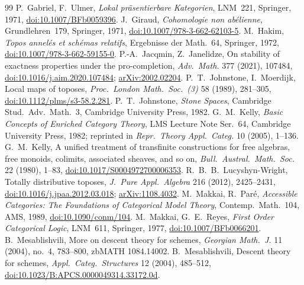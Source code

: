 \documentclass[11pt,a4paper]{amsart}
\theoremstyle{definition}
\theoremstyle{remark}
\begin{document}
\begin{thebibliography}{99}
 P.~Gabriel, F.~Ulmer, \emph{Lokal präsentierbare Kategorien}, LNM~221, Springer, 1971, \href{https://doi.org/10.1007/BFb0059396}{doi:10.1007/BFb0059396}.
 J.~Giraud, \emph{Cohomologie non abélienne}, Grundlehren~179, Springer, 1971, \href{https://doi.org/10.1007/978-3-662-62103-5}{doi:10.1007/978-3-662-62103-5}.
 M.~Hakim, \emph{Topos annelés et schémas relatifs}, Ergebnisse der Math.~64, Springer, 1972, \href{https://doi.org/10.1007/978-3-662-59155-0}{doi:10.1007/978-3-662-59155-0}.
 P.-A.~Jacqmin, Z.~Janelidze, On stability of exactness properties under the pro-completion, \emph{Adv.\ Math.} 377 (2021), 107484, \href{https://doi.org/10.1016/j.aim.2020.107484}{doi:10.1016/j.aim.2020.107484}; \href{https://arxiv.org/abs/2002.02204}{arXiv:2002.02204}.
 P.~T.~Johnstone, I.~Moerdijk, Local maps of toposes, \emph{Proc.\ London Math.\ Soc.~(3)} 58 (1989), 281--305, \href{https://doi.org/10.1112/plms/s3-58.2.281}{doi:10.1112/plms/s3-58.2.281}.
 P.~T.~Johnstone, \emph{Stone Spaces}, Cambridge Stud.\ Adv.\ Math.~3, Cambridge University Press, 1982.
 G.~M.~Kelly, \emph{Basic Concepts of Enriched Category Theory}, LMS Lecture Note Ser.~64, Cambridge University Press, 1982; reprinted in \emph{Repr.\ Theory Appl.\ Categ.} 10 (2005), 1--136.
 G.~M.~Kelly, A unified treatment of transfinite constructions for free algebras, free monoids, colimits, associated sheaves, and so on, \emph{Bull.\ Austral.\ Math.\ Soc.} 22 (1980), 1--83, \href{https://doi.org/10.1017/S0004972700006353}{doi:10.1017/S0004972700006353}.
 R.~B.~B.~Lucyshyn-Wright, Totally distributive toposes, \emph{J.\ Pure Appl.\ Algebra} 216 (2012), 2425--2431, \href{https://doi.org/10.1016/j.jpaa.2012.03.018}{doi:10.1016/j.jpaa.2012.03.018}; \href{https://arxiv.org/abs/1108.4032}{arXiv:1108.4032}.
 M.~Makkai, R.~Paré, \emph{Accessible Categories: The Foundations of Categorical Model Theory}, Contemp.\ Math.~104, AMS, 1989, \href{https://doi.org/10.1090/conm/104}{doi:10.1090/conm/104}.
 M.~Makkai, G.~E.~Reyes, \emph{First Order Categorical Logic}, LNM~611, Springer, 1977, \href{https://doi.org/10.1007/BFb0066201}{doi:10.1007/BFb0066201}.
 B.~Mesablishvili, More on descent theory for schemes, \emph{Georgian Math.\ J.} 11 (2004), no.~4, 783--800, zbMATH 1084.14002.
 B.~Mesablishvili, Descent theory for schemes, \emph{Appl.\ Categ.\ Structures} 12 (2004), 485--512, \href{https://doi.org/10.1023/B:APCS.0000049314.33172.0d}{doi:10.1023/B:APCS.0000049314.33172.0d}.

\end{thebibliography}
\end{document}
